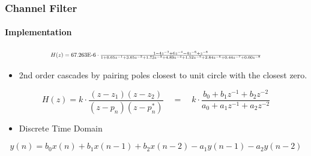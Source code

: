 \begin{frame} \frametitle{Channel Filter}
    \framesubtitle{Implementation}

\begin{equation*}
\resizebox{9cm}{!}{
    $H(z) = 67.263\text{E-6} \cdot \frac{1 - 4z^{-2} + 6z^{-4} - 4z^{-6} + z^{-8} }{1 + 0.65 z^{-1} + 3.65 z^{-2} + 1.73 z^{-3} + 4.89 z^{-4} + 1.52 z^{-5} + 2.84 z^{-6} + 0.44 z^{-7} + 0.60z^{-8}}$
}
\end{equation*}
\begin{itemize}
    \item 2nd order cascades by pairing poles closest to unit circle with the closest zero.
\end{itemize}
\begin{equation*}
    H(z) = k\cdot\frac{(z-z_1)(z-z_2)}{(z-p_n)(z-p_n^*)}\quad=\quad k\cdot\frac{b_0+b_1z^{-1}+b_2z^{-2}}{a_0+a_1z^{-1}+a_2z^{-2}}
\end{equation*}
\begin{itemize}
    \item Discrete Time Domain
\end{itemize}
\begin{equation*}
           y(n) = b_0x(n) + b_1x(n-1) + b_2x(n-2) - a_1y(n-1) - a_2y(n-2)
\end{equation*}
\end{frame}

